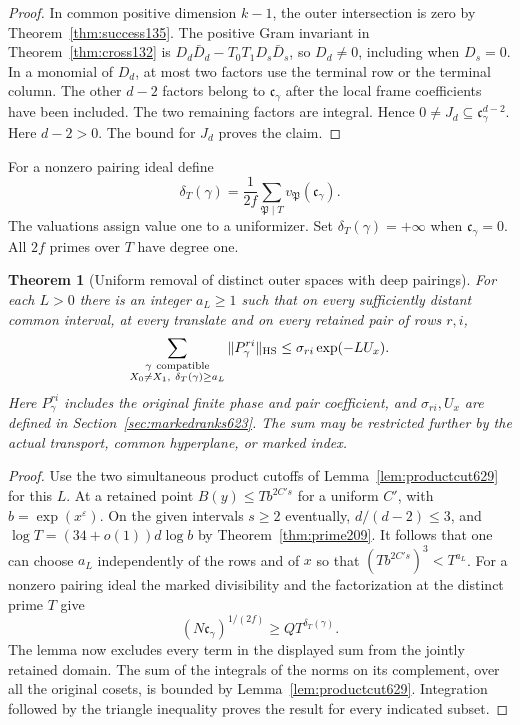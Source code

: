 \documentclass[a4paper,11pt]{article}
\newtheorem{theorem}[proposition]{Theorem}
\theoremstyle{definition}
\theoremstyle{remark}
\numberwithin{equation}{section}
\begin{document}
\begin{proof}
In common positive dimension \(k-1\), the outer intersection is
zero by Theorem~\ref{thm:success135}. The positive Gram invariant
in Theorem~\ref{thm:cross132} is
\(D_d\bar D_d-T_0T_1D_s\bar D_s\), so \(D_d\ne0\), including
when \(D_s=0\). In a monomial of \(D_d\), at most two factors
use the terminal row or the terminal column. The other \(d-2\)
factors belong to \(\mathfrak c_\gamma\) after the local frame
coefficients have been included. The two remaining factors are
integral. Hence \(0\ne J_d\subseteq\mathfrak c_\gamma^{d-2}\).
Here \(d-2>0\). The bound for \(J_d\) proves the claim.
\end{proof}

For a nonzero pairing ideal define
\[
   \delta_T(\gamma)=\frac1{2f}\sum_{\mathfrak P\mid T}
                            v_{\mathfrak P}(\mathfrak c_\gamma).
\]
The valuations assign value one to a uniformizer. Set
\(\delta_T(\gamma)=+\infty\) when \(\mathfrak c_\gamma=0\).
All \(2f\) primes over \(T\) have degree one.

\begin{theorem}[Uniform removal of distinct outer spaces with deep pairings]
\leavevmode\label{thm:terminalouter639}
For each \(L>0\) there is an integer \(a_L\ge1\) such that on
every sufficiently distant common interval, at every translate
and on every retained pair of rows \(r,i\),
\[
  \sum_{\substack{\gamma\ {\rm compatible}\\
              X_0\ne X_1,\ \delta_T(\gamma)\ge a_L}}
                \|P_\gamma^{ri}\|_{\rm HS}
              \le \sigma_{ri}\exp(-L U_x).
\]
Here \(P_\gamma^{ri}\) includes the original finite phase and
pair coefficient, and \(\sigma_{ri},U_x\) are defined in
Section~\ref{sec:markedranks623}. The sum may be restricted
further by the actual transport, common hyperplane, or marked
index.
\end{theorem}
\begin{proof}
Use the two simultaneous product cutoffs of
Lemma~\ref{lem:productcut629} for this \(L\). At a retained
point \(B(y)\le T b^{2C's}\) for a uniform \(C'\), with
\(b=\exp(x^\varepsilon)\). On the given intervals \(s\ge2\)
eventually, \(d/(d-2)\le3\), and
\(\log T=(34+o(1))d\log b\) by Theorem~\ref{thm:prime209}.
It follows that one can choose \(a_L\) independently of the rows
and of \(x\) so that \((Tb^{2C's})^3<T^{a_L}\).
For a nonzero pairing ideal the marked divisibility and the
factorization at the distinct prime \(T\) give
\[
                 (N\mathfrak c_\gamma)^{1/(2f)}
                                  \ge Q T^{\delta_T(\gamma)} .
\]
The lemma now excludes every term in the displayed sum from the
jointly retained domain. The sum of the integrals of the norms
on its complement, over all the original cosets, is bounded by
Lemma~\ref{lem:productcut629}. Integration followed by the
triangle inequality proves the result for every indicated subset.
\end{proof}
\end{document}
